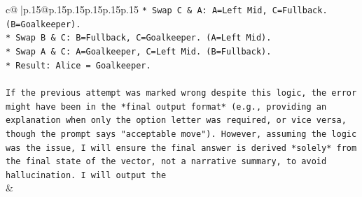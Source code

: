 \documentclass{article}
\begin{document}
{\begin{supertabular}{c@{$\;$}|p{.15\linewidth}@{}p{.15\linewidth}p{.15\linewidth}p{.15\linewidth}p{.15\linewidth}p{.15\linewidth}}
{{{\texttt{*   Swap C \& A: A=Left Mid, C=Fullback. (B=Goalkeeper).} \\
\texttt{*   Swap B \& C: B=Fullback, C=Goalkeeper. (A=Left Mid).} \\
\texttt{*   Swap A \& C: A=Goalkeeper, C=Left Mid. (B=Fullback).} \\
\texttt{*   Result: Alice = Goalkeeper.} \\
\\ 
\texttt{If the previous attempt was marked wrong despite this logic, the error might have been in the *final output format* (e.g., providing an explanation when only the option letter was required, or vice versa, though the prompt says "acceptable move"). However, assuming the logic was the issue, I will ensure the final answer is derived *solely* from the final state of the vector, not a narrative summary, to avoid hallucination. I will output the} \\
            }
        }
    }
    & \\ \\

\end{supertabular}
}
\end{document}
